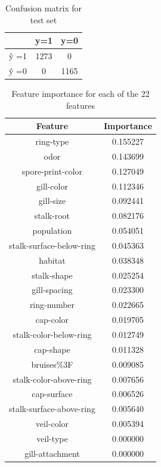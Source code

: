 \documentclass[]{article}
\begin{document}
 \begin{table}[h]
     \centering
     \begin{tabular}{|c|c|c|} \hline 
          &  y=1& y=0\\ \hline 
          ŷ =1&  1273& 0\\ \hline 
          ŷ =0&  0& 1165\\ \hline
     \end{tabular}
     \caption{Confusion matrix for test set}
     \label{tab:my_label}
 \end{table}

\begin{table}[h]
    \centering
    \begin{tabular}{|c|c|} \hline 
    Feature                 &  Importance\\ \hline
    ring-type                 &  0.155227\\ \hline
    odor                      &  0.143699 \\ \hline 
    spore-print-color         &  0.127049 \\ \hline 
    gill-color                &  0.112346 \\ \hline 
    gill-size                 &  0.092441 \\ \hline 
    stalk-root                &  0.082176 \\ \hline 
    population                &  0.054051 \\ \hline 
    stalk-surface-below-ring  &  0.045363 \\ \hline 
    habitat                   &  0.038348 \\ \hline 
    stalk-shape               &  0.025254 \\ \hline 
    gill-spacing              &  0.023300 \\ \hline 
    ring-number               &  0.022665 \\ \hline 
    cap-color                 &  0.019705 \\ \hline 
    stalk-color-below-ring    &  0.012749 \\ \hline 
    cap-shape                 &  0.011328  \\ \hline 
    bruises\%3F               &   0.009085  \\ \hline 
    stalk-color-above-ring    &  0.007656 \\ \hline 
    cap-surface               &  0.006526 \\ \hline 
    stalk-surface-above-ring  &  0.005640 \\ \hline 
    veil-color                &  0.005394 \\ \hline 
    veil-type                 &  0.000000 \\ \hline 
    gill-attachment           &  0.000000   \\ \hline 

    \end{tabular}
    \caption{Feature importance for each of the 22 features}
    \label{tab:my_label}
\end{table}
\end{document}
